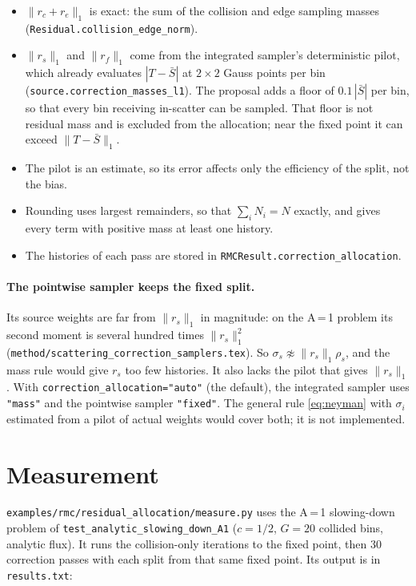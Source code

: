 \documentclass[11pt]{article}
\newcommand{\Sbar}{\bar S}
\begin{document}
\begin{itemize}
  \item $\|r_c + r_e\|_1$ is exact: the sum of the collision and edge sampling masses
  (\texttt{Residual.collision\_edge\_norm}).
  \item $\|r_s\|_1$ and $\|r_f\|_1$ come from the integrated sampler's deterministic
  pilot, which already evaluates $|T - \Sbar|$ at $2\times2$ Gauss points per bin
  (\texttt{source.correction\_masses\_l1}). The proposal adds a floor of
  $0.1\,|\Sbar|$ per bin, so that every bin receiving in-scatter can be sampled. That
  floor is not residual mass and is excluded from the allocation; near the fixed point
  it can exceed $\|T-\Sbar\|_1$.
  \item The pilot is an estimate, so its error affects only the efficiency of the
  split, not the bias.
  \item Rounding uses largest remainders, so that $\sum_iN_i=N$ exactly, and gives
  every term with positive mass at least one history.
  \item The histories of each pass are stored in \texttt{RMCResult.correction\_allocation}.
\end{itemize}

\paragraph{The pointwise sampler keeps the fixed split.} Its source weights are far
from $\|r_s\|_1$ in magnitude: on the A\,=\,1 problem its second moment is several
hundred times $\|r_s\|_1^2$ (\texttt{method/scattering\_correction\_samplers.tex}). So
$\sigma_s\not\approx\|r_s\|_1\rho_s$, and the mass rule would give $r_s$ too few
histories. It also lacks the pilot that gives $\|r_s\|_1$. With
\texttt{correction\_allocation="auto"} (the default), the integrated sampler uses
\texttt{"mass"} and the pointwise sampler \texttt{"fixed"}. The general rule
\eqref{eq:neyman} with $\sigma_i$ estimated from a pilot of actual weights would
cover both; it is not implemented.

\section{Measurement}

\texttt{examples/rmc/residual\_allocation/measure.py} uses the A\,=\,1 slowing-down
problem of \texttt{test\_analytic\_slowing\_down\_A1} ($c=1/2$, $G=20$ collided bins,
analytic flux). It runs the collision-only iterations to the fixed point, then 30
correction passes with each split from that same fixed point. Its output is in
\texttt{results.txt}:
\end{document}
